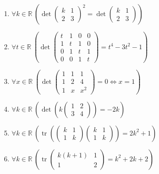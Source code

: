 \documentclass[11pt,a4paper]{article}
\begin{document}
\begin{enumerate}
\item $\displaystyle \forall k \in \mathbb{R}\ \left( \det \begin{pmatrix} k & 1 \\ 2 & 3 \end{pmatrix}^{2} = \det \begin{pmatrix} k & 1 \\ 2 & 3 \end{pmatrix} \right)$
\item $\displaystyle \forall t \in \mathbb{R}\ \left( \det \begin{pmatrix} t & 1 & 0 & 0 \\ 1 & t & 1 & 0 \\ 0 & 1 & t & 1 \\ 0 & 0 & 1 & t \end{pmatrix} = t^{4} - 3t^{2} - 1 \right)$
\item $\displaystyle \forall x \in \mathbb{R}\ \left( \det \begin{pmatrix} 1 & 1 & 1 \\ 1 & 2 & 4 \\ 1 & x & x^{2} \end{pmatrix} = 0 \iff x = 1 \right)$
\item $\displaystyle \forall k \in \mathbb{R}\ \left( \det\left( k \begin{pmatrix} 1 & 2 \\ 3 & 4 \end{pmatrix} \right) = -2k \right)$
\item $\displaystyle \forall k \in \mathbb{R}\ \left( \operatorname{tr}\left( \begin{pmatrix} k & 1 \\ 1 & k \end{pmatrix} \begin{pmatrix} k & 1 \\ 1 & k \end{pmatrix} \right) = 2k^{2} + 1 \right)$
\item $\displaystyle \forall k \in \mathbb{R}\ \left( \operatorname{tr} \begin{pmatrix} k(k + 1) & 1 \\ 1 & 2 \end{pmatrix} = k^{2} + 2k + 2 \right)$
\end{enumerate}
\end{document}
